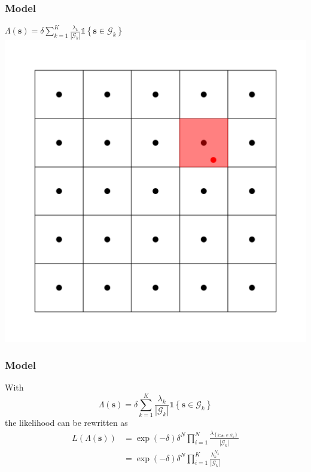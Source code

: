 \documentclass[10pt, compress]{beamer}
\begin{document}
  \begin{frame}
    \frametitle{Model}
    \centering
    $ \Lambda(\mathbf{s}) = \delta \sum_{k=1}^K \frac{\lambda_k}{|\mathcal{G}_k|} \mathds{1} \left\{ \mathbf{s} \in \mathcal{G}_k \right\} $
    \includegraphics[height=0.8\textheight]{grid_spot_highlighted.pdf}
  \end{frame}
  \begin{frame}
    \frametitle{Model}
    With $$\Lambda(\mathbf{s}) = \delta \sum_{k=1}^K \frac{\lambda_k}{|\mathcal{G}_k|} \mathds{1} \left\{ \mathbf{s} \in \mathcal{G}_k \right\}$$
    the likelihood can be rewritten as
    \begin{align*}
      L(\Lambda(\mathbf{s})) &= \exp\left(-\delta\right) \delta^N \prod_{i=1}^{N}\frac{\lambda_{\left\{k: \mathbf{s_i} \in \mathcal{G}_k \right\}}}{|\mathcal{G}_k|} \\
      &= \exp\left(-\delta\right) \delta^N \prod_{i=1}^{K}\frac{\lambda_k^{N_k}}{|\mathcal{G}_k|} 
    \end{align*}
  \end{frame}
\end{document}
